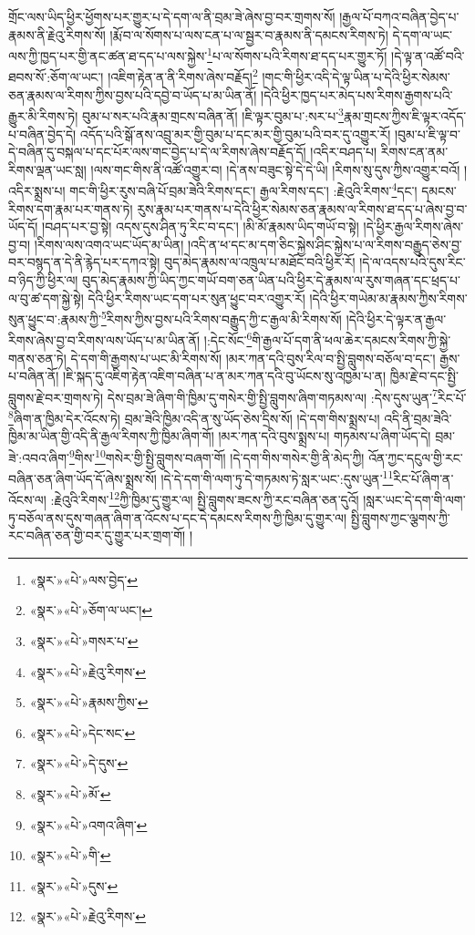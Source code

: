 གྲོང་ལས་ཡིད་ཕྱིར་ཕྱོགས་པར་གྱུར་པ་དེ་དག་ལ་ནི་བྲམ་ཟེ་ཞེས་བྱ་བར་གྲགས་སོ། །རྒྱལ་པོ་བཀའ་བཞིན་བྱེད་པ་རྣམས་ནི་རྗེའུ་རིགས་སོ། །རྨོ་བ་ལ་སོགས་པ་ལས་ངན་པ་ལ་སྦྱར་བ་རྣམས་ནི་དམངས་རིགས་ཏེ། དེ་དག་ལ་ཡང་ལས་ཀྱི་ཁྱད་པར་གྱི་ནང་ཚན་ཐ་དད་པ་ལས་སྐྱེས་\footnote{«སྣར་»«པེ་»ལས་བྱེད་}པ་ལ་སོགས་པའི་རིགས་ཐ་དད་པར་གྱུར་ཏོ། །དེ་ལྟ་ན་འཚོ་བའི་ཐབས་སོ་:ཅོག་ལ་ཡང་། །འཇིག་རྟེན་ན་ནི་རིགས་ཞེས་བརྗོད།\footnote{«སྣར་»«པེ་»ཅོག་ལ་ཡང་།} །གང་གི་ཕྱིར་འདི་དེ་ལྟ་ཡིན་པ་དེའི་ཕྱིར་སེམས་ཅན་རྣམས་ལ་རིགས་ཀྱིས་བྱས་པའི་དབྱེ་བ་ཡོད་པ་མ་ཡིན་ནོ། །དེའི་ཕྱིར་ཁྱད་པར་མེད་པས་རིགས་རྒྱགས་པའི་རྒྱུར་མི་རིགས་ཏེ། བུམ་པ་སར་པའི་རྣམ་གྲངས་བཞིན་ནོ། །ཇི་ལྟར་བུམ་པ་:སར་པ་\footnote{«སྣར་»«པེ་»གསར་པ་}རྣམ་གྲངས་ཀྱིས་ཇི་ལྟར་འདོད་པ་བཞིན་བྱེད་དེ། འདོད་པའི་སྒོ་ནས་འབྲུ་མར་གྱི་བུམ་པ་དང་མར་གྱི་བུམ་པའི་བར་དུ་འགྱུར་རོ། །བུམ་པ་ཇི་ལྟ་བ་དེ་བཞིན་དུ་བསྐལ་པ་དང་པོར་ལས་གང་བྱེད་པ་དེ་ལ་རིགས་ཞེས་བརྗོད་དོ། །འདིར་བཤད་པ། རིགས་ངན་ནམ་རིགས་ལྡན་ཡང་སླ། །ལས་གང་གིས་ནི་འཚོ་འགྱུར་བ། །དེ་ནས་བཟུང་སྟེ་དེ་དེ་ཡི། །རིགས་སུ་དུས་ཀྱིས་འགྱུར་བའོ། །འདིར་སྨྲས་པ། གང་གི་ཕྱིར་རུས་བཞི་པོ་བྲམ་ཟེའི་རིགས་དང་། རྒྱལ་རིགས་དང་། :རྗེའུའི་རིགས་\footnote{«སྣར་»«པེ་»རྗེའུ་རིགས་}དང་། དམངས་རིགས་དག་རྣམ་པར་གནས་ཏེ། རུས་རྣམ་པར་གནས་པ་དེའི་ཕྱིར་སེམས་ཅན་རྣམས་ལ་རིགས་ཐ་དད་པ་ཞེས་བྱ་བ་ཡོད་དོ། །བཤད་པར་བྱ་སྟེ། འདས་དུས་ཤིན་ཏུ་རིང་བ་དང་། །མི་མོ་རྣམས་ཡིད་གཡོ་བ་སྟེ། །དེ་ཕྱིར་རྒྱལ་རིགས་ཞེས་བྱ་བ། །རིགས་ལས་འགའ་ཡང་ཡོད་མ་ཡིན། །འདི་ན་ཕ་དང་མ་དག་ཅིང་སྐྱེས་ཤིང་སྐྱེས་པ་ལ་རིགས་བརྒྱུད་ཅེས་བྱ་བར་བསྙད་ན་དེ་ནི་རྙེད་པར་དཀའ་སྟེ། བུད་མེད་རྣམས་ལ་འཁྲུལ་པ་མཐོང་བའི་ཕྱིར་རོ། །དེ་ལ་འདས་པའི་དུས་རིང་བ་ཉིད་ཀྱི་ཕྱིར་ལ། བུད་མེད་རྣམས་ཀྱི་ཡིད་ཀྱང་གཡོ་བག་ཅན་ཡིན་པའི་ཕྱིར་དེ་རྣམས་ལ་རུས་གཞན་དང་ཕྲད་པ་ལ་བུ་ཚ་དག་སྐྱེ་སྟེ། དེའི་ཕྱིར་རིགས་ཡང་དག་པར་སུན་ཕྱུང་བར་འགྱུར་རོ། །དེའི་ཕྱིར་གཡེམ་མ་རྣམས་ཀྱིས་རིགས་སུན་ཕྱུང་བ་:རྣམས་ཀྱི་\footnote{«སྣར་»«པེ་»རྣམས་ཀྱིས་}རིགས་ཀྱིས་བྱས་པའི་རིགས་བརྒྱུད་ཀྱི་ང་རྒྱལ་མི་རིགས་སོ། །དེའི་ཕྱིར་དེ་ལྟར་ན་རྒྱལ་རིགས་ཞེས་བྱ་བ་རིགས་ལས་ཡོད་པ་མ་ཡིན་ནོ། །:དེང་སོང་\footnote{«སྣར་»«པེ་»དེང་སང་}གི་རྒྱལ་པོ་དག་ནི་ཕལ་ཆེར་དམངས་རིགས་ཀྱི་སྐྱེ་གནས་ཅན་ཏེ། དེ་དག་གི་རྒྱགས་པ་ཡང་མི་རིགས་སོ། །མར་ཀན་དའི་བུས་རིལ་བ་སྤྱི་བླུགས་བཅོལ་བ་དང་། རྒྱས་པ་བཞིན་ནོ། །ཇི་སྐད་དུ་འཇིག་རྟེན་འཇིག་བཞིན་པ་ན་མར་ཀན་དའི་བུ་ཡོངས་སུ་འཁྱམ་པ་ན། ཁྱིམ་རྗེ་བ་དང་སྤྱི་བླུགས་རྗེ་བར་གྲགས་ཏེ། དེས་བྲམ་ཟེ་ཞིག་གི་ཁྱིམ་དུ་གསེར་གྱི་སྤྱི་བླུགས་ཞིག་གཏམས་ལ། :དེས་དུས་ཡུན་\footnote{«སྣར་»«པེ་»དེ་དུས་}རིང་པོ་\footnote{«སྣར་»«པེ་»མོ་}ཞིག་ན་ཁྱིམ་དེར་འོངས་ཏེ། བྲམ་ཟེའི་ཁྱིམ་འདི་ན་སུ་ཡོད་ཅེས་དྲིས་སོ། །དེ་དག་གིས་སྨྲས་པ། འདི་ནི་བྲམ་ཟེའི་ཁྱིམ་མ་ཡིན་གྱི་འདི་ནི་རྒྱལ་རིགས་ཀྱི་ཁྱིམ་ཞིག་གོ། །མར་ཀན་དའི་བུས་སྨྲས་པ། གཏམས་པ་ཞིག་ཡོད་དེ། བྲམ་ཟེ་:འབའ་ཞིག་\footnote{«སྣར་»«པེ་»འགའ་ཞིག་}གིས་\footnote{«སྣར་»«པེ་»གི་}གསེར་གྱི་སྤྱི་བླུགས་བཞག་གོ། །དེ་དག་གིས་གསེར་གྱི་ནི་མེད་ཀྱི། འོན་ཀྱང་དངུལ་གྱི་རང་བཞིན་ཅན་ཞིག་ཡོད་དོ་ཞེས་སྨྲས་སོ། །དེ་དེ་དག་གི་ལག་ཏུ་དེ་གཏམས་ཏེ་སླར་ཡང་:དུས་ཡུན་\footnote{«སྣར་»«པེ་»དུས་}རིང་པོ་ཞིག་ན་འོངས་ལ། :རྗེའུའི་རིགས་\footnote{«སྣར་»«པེ་»རྗེའུ་རིགས་}ཀྱི་ཁྱིམ་དུ་གྱུར་ལ། སྤྱི་བླུགས་ཟངས་ཀྱི་རང་བཞིན་ཅན་དུའོ། །སླར་ཡང་དེ་དག་གི་ལག་ཏུ་བཅོལ་ནས་དུས་གཞན་ཞིག་ན་འོངས་པ་དང་དེ་དམངས་རིགས་ཀྱི་ཁྱིམ་དུ་གྱུར་ལ། སྤྱི་བླུགས་ཀྱང་ལྕགས་ཀྱི་རང་བཞིན་ཅན་གྱི་བར་དུ་གྱུར་པར་གྲག་གོ། །
